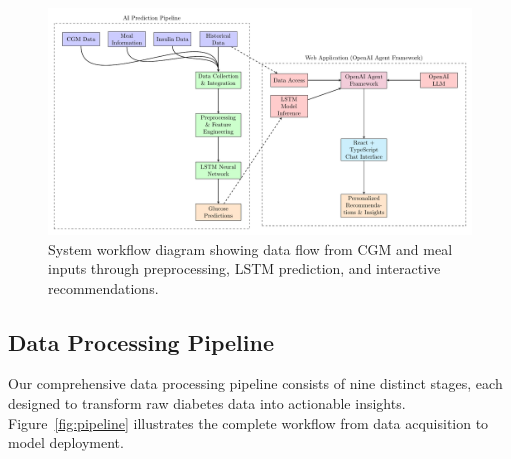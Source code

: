\documentclass[acmsmall]{acmart}
\begin{document}
\begin{figure}[h]
  \centering
  \includegraphics[width=\linewidth]{system_workflow}
  \caption{System workflow diagram showing data flow from CGM and meal inputs through preprocessing, LSTM prediction, and interactive recommendations.}
  \label{fig:workflow}
\end{figure}

\subsection{Data Processing Pipeline}

Our comprehensive data processing pipeline consists of nine distinct stages, each designed to transform raw diabetes data into actionable insights. Figure~\ref{fig:pipeline} illustrates the complete workflow from data acquisition to model deployment.
\end{document}
